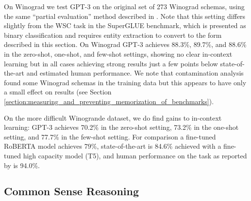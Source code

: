 \documentclass{article}
\begin{document}
On Winograd we test GPT-3 on the original set of 273 Winograd schemas, using the same ``partial evaluation'' method described in \cite{radford2019language}.  Note that this setting differs slightly from the WSC task in the SuperGLUE benchmark, which is presented as binary classification and requires entity extraction to convert to the form described in this section.  On Winograd GPT-3 achieves 88.3\%, 89.7\%, and 88.6\% in the zero-shot, one-shot, and few-shot settings, showing no clear in-context learning but in all cases achieving strong results just a few points below state-of-the-art and estimated human performance.  We note that contamination analysis found some Winograd schemas in the training data but this appears to have only a small effect on results (see Section \ref{section:measuring_and_preventing_memorization_of_benchmarks}).

On the more difficult Winogrande dataset, we do find gains to in-context learning: GPT-3 achieves 70.2\% in the zero-shot setting, 73.2\% in the one-shot setting, and 77.7\% in the few-shot setting.  For comparison a fine-tuned RoBERTA model achieves 79\%, state-of-the-art is 84.6\% achieved with a fine-tuned high capacity model (T5), and human performance on the task as reported by \cite{sakaguchi2019winogrande} is 94.0\%.

     
    \subsection{Common Sense Reasoning}
    \label{section:Common_Sense_Reasoning}
    
\end{document}
